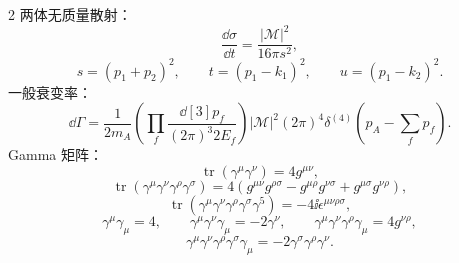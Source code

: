 \begin{multicols}{2}
两体无质量散射：
\[
\frac{\dd\sigma}{\dd t}=\frac{|\mathcal M|^2}{16\pi s^2},
\]
\[
s=(p_1+p_2)^2,\qquad t=(p_1-k_1)^2,\qquad u=(p_1-k_2)^2.
\]
一般衰变率：
\[
\dd\Gamma=\frac1{2m_A}\left(\prod_f\frac{\dd[3]{p_f}}{(2\pi)^3 2E_f}\right)
|\mathcal M|^2(2\pi)^4\delta^{(4)}\!\left(p_A-\sum_fp_f\right).
\]
Gamma 矩阵：
\[
\operatorname{tr}(\gamma^\mu\gamma^\nu)=4g^{\mu\nu},
\]
\[
\operatorname{tr}(\gamma^\mu\gamma^\nu\gamma^\rho\gamma^\sigma)
=4(g^{\mu\nu}g^{\rho\sigma}-g^{\mu\rho}g^{\nu\sigma}+g^{\mu\sigma}g^{\nu\rho}),
\]
\[
\operatorname{tr}(\gamma^\mu\gamma^\nu\gamma^\rho\gamma^\sigma\gamma^5)
=-4\ii\epsilon^{\mu\nu\rho\sigma},
\]
\[
\gamma^\mu\gamma_\mu=4,
\qquad
\gamma^\mu\gamma^\nu\gamma_\mu=-2\gamma^\nu,
\qquad
\gamma^\mu\gamma^\nu\gamma^\rho\gamma_\mu=4g^{\nu\rho},
\]
\[
\gamma^\mu\gamma^\nu\gamma^\rho\gamma^\sigma\gamma_\mu
=-2\gamma^\sigma\gamma^\rho\gamma^\nu.
\]
\end{multicols}
\normalsize

